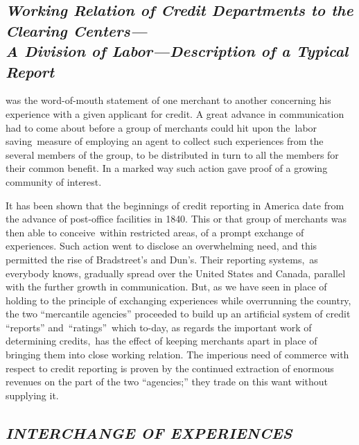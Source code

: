 \documentclass[openany,nobib]{tufte-book}
\begin{document}
\hypertarget{working-relation-of-credit-departments-to-the-clearing-centersa-division-of-labordescription-of-a-typical-report}{%
\subsection{\texorpdfstring{\emph{Working Relation of Credit
Departments to the Clearing Centers---\\\noindent A Division of Labor---Description
of a Typical
Report}}{Working Relation of Credit Departments to the Clearing Centers--- A Division of Labor---Description of a Typical Report}}\label{working-relation-of-credit-departments-to-the-clearing-centersa-division-of-labordescription-of-a-typical-report}}

 was the word-of-mouth statement of one merchant
to another concerning his experience with a given applicant for credit.
A great advance in communication had to come about before a group of
merchants could hit upon the~labor saving~measure of employing an agent
to collect such experiences from the several members of the group, to be
distributed in turn to all the members for their common benefit. In a
marked way such action gave proof of a growing community of interest.~

It has been shown that the beginnings of credit reporting in America
date from the advance of post-office facilities in 1840. This or that
group of merchants was then able to conceive~within restricted areas, of
a prompt exchange of experiences. Such action went to disclose an
overwhelming need, and this permitted the rise of Bradstreet's and
Dun's. Their reporting systems,~as everybody knows, gradually spread
over the United States and Canada, parallel with the further growth in
communication. But, as we have seen in place of holding to the principle
of exchanging experiences while overrunning the country, the two
``mercantile agencies'' proceeded to build up an artificial system of
credit ``reports'' and~``ratings''~which to-day, as regards the
important work of determining credits,~has the effect of keeping
merchants apart in place of bringing them into close working relation.
The imperious need of commerce with respect to credit reporting is
proven by the continued extraction of enormous revenues on the part of
the two ``agencies;'' they trade on this want without supplying it.~

\hypertarget{interchange-of-experiences}{%
\subsection{\texorpdfstring{\emph{INTERCHANGE OF
EXPERIENCES}}{INTERCHANGE OF EXPERIENCES}}\label{interchange-of-experiences}}
\end{document}
